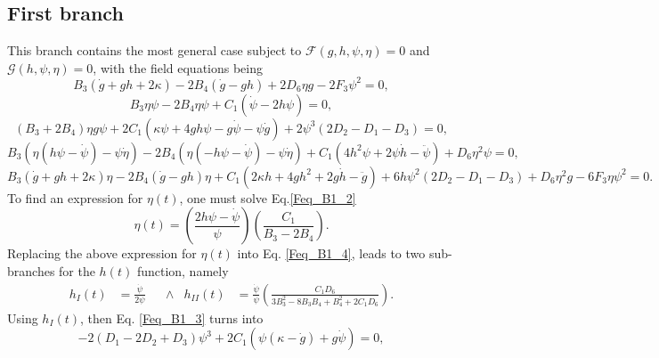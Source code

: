 \subsection{First branch}
\label{sec:first_branch}

This branch contains the most general case subject to $\mathcal{F}(g,h,\psi,\eta) = 0$ and $\mathcal{G}(h,\psi,\eta) = 0$, with the field equations being
\begin{dmath}
    \label{Feq_B1_1}
    B_3\left(\dot{g} + gh + 2\kappa\right) - 2B_4\left(\dot{g} - gh\right) + 2D_6\eta g - 2F_3\psi^2 = 0,
\end{dmath}
\begin{dmath}
    \label{Feq_B1_2}
    B_3\eta\psi -2B_4\eta\psi + C_1\left(\dot{\psi} - 2h\psi\right) = 0,
\end{dmath}
\begin{dmath}
    \label{Feq_B1_3}
    \left(B_3 + 2B_4\right)\eta g\psi + 2C_1\left(\kappa\psi + 4gh\psi - g\dot{\psi} - \psi\dot{g}\right) + 2\psi^3\left(2D_2 - D_1 - D_3\right) = 0,
\end{dmath}
\begin{dmath}
    \label{Feq_B1_4}
    B_3\left(\eta\left(h\psi - \dot{\psi}\right) -\psi\dot{\eta}\right) - 2B_4\left(\eta\left(-h\psi - \dot{\psi}\right) -\psi\dot{\eta}\right) 
    + C_1\left(4h^2\psi + 2\psi\dot{h} -\ddot{\psi}\right) + D_6\eta^2\psi = 0,
\end{dmath}
\begin{dmath}
    \label{Feq_B1_5}
    B_3\left(\dot{g} + gh + 2\kappa\right)\eta - 2B_4\left(\dot{g} - gh\right)\eta + C_1\left(2\kappa h + 4gh^2 + 2g\dot{h} - \ddot{g}\right) +
    6h\psi^2\left(2D_2 - D_1 - D_3\right) + D_6 \eta^2 g - 6F_3\eta\psi^2 = 0.
\end{dmath}
To find an expression for $\eta(t)$, one must solve Eq.\eqref{Feq_B1_2} 
\begin{equation}
    \label{B1_eta}
    \eta(t) = \left(\frac{2h\psi - \dot{\psi}}{\psi}\right)\left(\frac{C_1}{B_3 - 2B_4}\right).
\end{equation}
Replacing the above expression for $\eta(t)$ into Eq. \eqref{Feq_B1_4}, leads to two sub-branches for the $h(t)$ function, namely
\begin{align}
    \label{B1_h}
    h_I(t) & = \frac{\dot{\psi}}{2\psi} & & \wedge &  h_{II}(t) & = \frac{\dot{\psi}}{\psi}\left(\frac{C_1 D_6}{3B_3^2 - 8B_3B_4 + B_4^2 + 2C_1D_6}\right).
\end{align}
Using $h_I(t)$, then Eq. \eqref{Feq_B1_3} turns into
\begin{equation}
    -2\left(D_1 - 2D_2 + D_3\right)\psi^3 + 2C_1\left(\psi\left(\kappa - \dot{g}\right) + g\dot{\psi}\right) = 0,
\end{equation}
